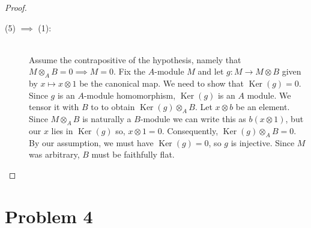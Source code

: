 \documentclass{article}
\newcommand{\tensor}{\otimes}
\DeclareMathOperator{\Ker}{Ker}
\begin{document}
\begin{proof}
\begin{description}
            \item [(5) $\implies$ (1):]\hfill\\
                Assume the contrapositive of the hypothesis, namely that
                $M\tensor_A B = 0 \implies M = 0$. Fix the $A$-module $M$ and
                let $g: M \to M \tensor B$ given by $x \mapsto x \tensor 1$ be
                the canonical map. We need to show that $\Ker(g) = 0$.  Since
                $g$ is an $A$-module homomorphism, $\Ker(g)$ is an $A$ module.
                We tensor it with $B$ to to obtain $\Ker(g) \tensor_A B$. Let
                $x \tensor b$ be an element. Since $M \tensor_A B$ is naturally
                a $B$-module we can write this as $b(x \tensor 1)$, but our $x$
                lies in $\Ker(g)$ so, $x \tensor 1 = 0$.  Consequently,
                $\Ker(g) \tensor_A B = 0$. By our assumption, we must have
                $\Ker(g) = 0$, so $g$ is injective. Since $M$ was arbitrary,
                $B$ must be faithfully flat.
        \end{description}
    \end{proof}

\section*{Problem 4}
\label{sec:problem_4}
\end{document}
